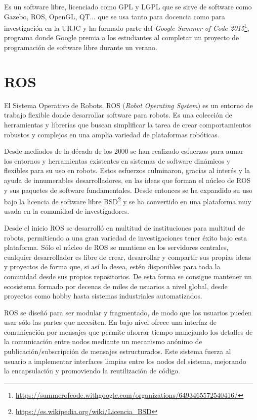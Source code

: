 Es un software libre, licenciado como GPL y LGPL que se sirve de software como Gazebo, ROS, OpenGL, QT... que se usa tanto para docencia como para investigación en la URJC y ha formado parte del \textit{Google Summer of Code 2015}\footnote{\url{https://summerofcode.withgoogle.com/organizations/6493465572540416/}}, programa donde Google premia a los estudiantes al completar un proyecto de programación de software libre durante un verano.


\section{ROS}
\label{sec:plat_ros}

El Sistema Operativo de Robots, ROS\cite{ros} (\textit{Robot Operating System}) es un entorno de trabajo flexible donde desarrollar software para robots. Es una colección de herramientas y librerías que buscan simplificar la tarea de crear comportamientos robustos y complejos en una amplia variedad de plataformas robóticas. 

Desde mediados de la década de los 2000 se han realizado esfuerzos para aunar los entornos y herramientas existentes en sistemas de software dinámicos y flexibles para su uso en robots. Estos esfuerzos culminaron, gracias al interés y la ayuda de innumerables desarrolladores, en las ideas que forman el núcleo de ROS y sus paquetes de software fundamentales. Desde entonces se ha expandido su uso bajo la licencia de software libre BSD\footnote{\url{https://es.wikipedia.org/wiki/Licencia_BSD}} y se ha convertido en una plataforma muy usada en la comunidad de investigadores.

Desde el inicio ROS se desarrolló en multitud de instituciones para multitud de robots, permitiendo a una gran variedad de investigaciones tener éxito bajo esta plataforma. Sólo el núcleo de ROS se mantiene en los servidores centrales, cualquier desarrollador es libre de crear, desarrollar y compartir sus propias ideas y proyectos de forma que, si así lo desea, estén disponibles para toda la comunidad desde sus propios repositorios. De esta forma se consigue mantener un ecosistema formado por decenas de miles de usuarios a nivel global, desde proyectos como hobby hasta sistemas industriales automatizados.

ROS se diseñó para ser modular y fragmentado, de modo que los usuarios pueden usar sólo las partes que necesiten. En bajo nivel ofrece una interfaz de comunicación por mensajes que permite ahorrar tiempo manejando los detalles de la comunicación entre nodos mediante un mecanismo anónimo de publicación/subscripción de mensajes estructurados. Este sistema fuerza al usuario a implementar interfaces limpias entre los nodos del sistema, mejorando la encapsulación y promoviendo la reutilización de código.

